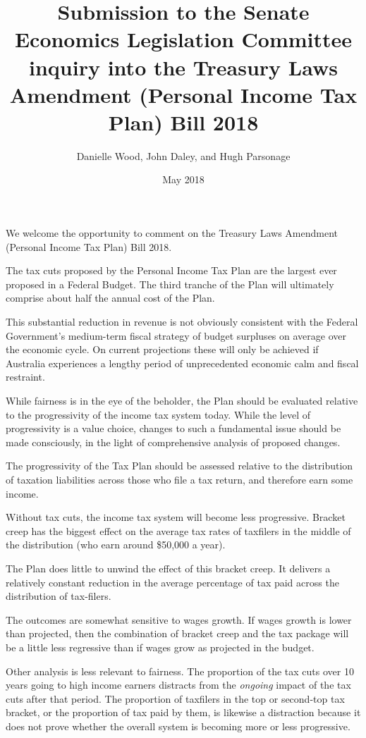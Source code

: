 \documentclass[submission]{grattan}
\date{May 2018}
\title{Submission to the Senate Economics Legislation Committee inquiry into the Treasury Laws Amendment (Personal Income Tax Plan) Bill 2018}
\author{Danielle Wood, John Daley, and Hugh Parsonage}
\begin{document}
\begin{summary}

We welcome the opportunity to comment on the Treasury Laws Amendment (Personal Income Tax Plan) Bill 2018.

The tax cuts proposed by the Personal Income Tax Plan are the largest ever proposed in a Federal Budget. The third tranche of the Plan will ultimately comprise about half the annual cost of the Plan.

This substantial reduction in revenue is not obviously consistent with the Federal Government's medium-term fiscal strategy of budget surpluses on average over the economic cycle. On current projections these will only be achieved if Australia experiences a lengthy period of unprecedented economic calm and fiscal restraint.

While fairness is in the eye of the beholder, the Plan should be evaluated relative to the progressivity of the income tax system today. While the level of progressivity is a value choice, changes to such a fundamental issue should be made consciously, in the light of comprehensive analysis of proposed changes.

The progressivity of the Tax Plan should be assessed relative to the distribution of taxation liabilities across those who file a tax return, and therefore earn some income.

Without tax cuts, the income tax system will become less progressive. Bracket creep has the biggest effect on the average tax rates of taxfilers in the middle of the distribution (who earn around \$50,000 a year).

The Plan does little to unwind the effect of this bracket creep. It delivers a relatively constant reduction in the average percentage of tax paid across the distribution of tax-filers.

The outcomes are somewhat sensitive to wages growth. If wages growth is lower than projected, then the combination of bracket creep and the tax package will be a little less regressive than if wages grow as projected in the budget.

Other analysis is less relevant to fairness. The proportion of the tax cuts over 10 years going to high income earners distracts from the \emph{ongoing} impact of the tax cuts after that period. The proportion of taxfilers in the top or second-top tax bracket, or the proportion of tax paid by them, is likewise a distraction because it does not prove whether the overall system is becoming more or less progressive.
\end{summary}
\end{document}
